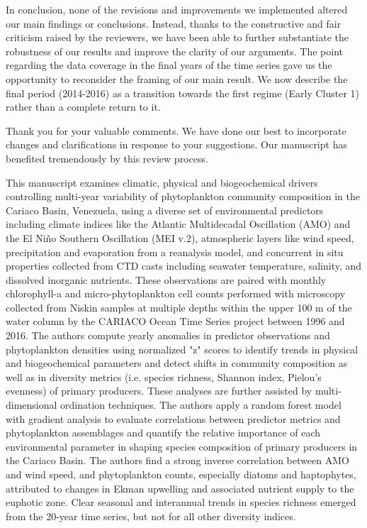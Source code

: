\documentclass[12pt,english]{reviewresponse}
\begin{document}
\begin{revresponse}
\begin{enumerate}
    \end{enumerate}
    In conclusion, none of the revisions and improvements we implemented altered our main findings or conclusions. Instead, thanks to the constructive and fair criticism raised by the reviewers, we have been able to further substantiate the robustness of our results and improve the clarity of our arguments. The point regarding the data coverage in the final years of the time series gave us the opportunity to reconsider the framing of our main result. We now describe the final period (2014-2016) as a transition towards the first regime (Early Cluster 1) rather than a complete return to it.
\end{revresponse}


\begin{concludingresponse}
	Thank you for your valuable comments. 
	We have done our best to incorporate changes and clarifications in response to your suggestions. Our manuscript has benefited tremendously by this review process.
\end{concludingresponse}


\reviewer
\begin{generalcomment}
	This manuscript examines climatic, physical and biogeochemical drivers controlling multi-year variability of phytoplankton community composition in the Cariaco Basin, Venezuela, using a diverse set of environmental predictors including climate indices like the Atlantic Multidecadal Oscillation (AMO) and the El Niño Southern Oscillation (MEI v.2), atmospheric layers like wind speed, precipitation and evaporation from a reanalysis model, and concurrent in situ properties collected from CTD casts including seawater temperature, salinity, and dissolved inorganic nutrients. These observations are paired with monthly chlorophyll-a and micro-phytoplankton cell counts performed with microscopy collected from Niskin samples at multiple depths within the upper 100 m of the water column by the CARIACO Ocean Time Series project between 1996 and 2016. The authors compute yearly anomalies in predictor observations and phytoplankton densities using normalized "z" scores to identify trends in physical and biogeochemical parameters and detect shifts in community composition as well as in diversity metrics (i.e. species richness, Shannon index, Pielou's evenness) of primary producers. These analyses are further assisted by multi-dimensional ordination techniques. The authors apply a random forest model with gradient analysis to evaluate correlations between predictor metrics and phytoplankton assemblages and quantify the relative importance of each environmental parameter in shaping species composition of primary producers in the Cariaco Basin. The authors find a strong inverse correlation between AMO and wind speed, and phytoplankton counts, especially diatoms and haptophytes, attributed to changes in Ekman upwelling and associated nutrient supply to the euphotic zone. Clear seasonal and interannual trends in species richness emerged from the 20-year time series, but not for all other diversity indices.
\end{generalcomment}
\end{document}

